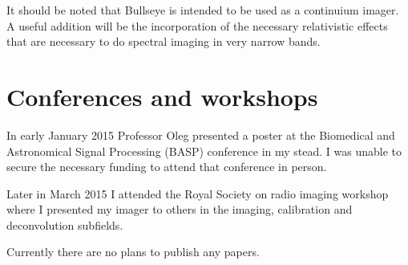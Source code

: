 \documentclass[a4paper,10pt]{article}
\begin{document}
It should be noted that Bullseye is intended to be used as a continuium imager. A useful addition will be the incorporation of 
the necessary relativistic effects that are necessary to do spectral imaging in very narrow bands.
\section{Conferences and workshops}
In early January 2015 Professor Oleg presented a poster at the Biomedical and Astronomical Signal Processing (BASP) conference 
in my stead. I was unable to secure the necessary funding to attend that conference in person.

Later in March 2015 I attended the Royal Society on radio imaging workshop where I presented my imager
to others in the imaging, calibration and deconvolution subfields.

Currently there are no plans to publish any papers.
\pagebreak
{}

\end{document}
